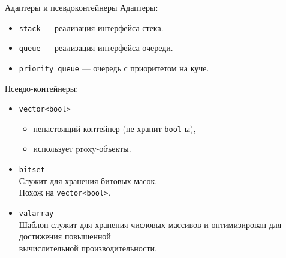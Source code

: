 \documentclass[aspectration=1610,t]{beamer}
\begin{document}
\begin{frame}{Адаптеры и псевдоконтейнеры}
    Адаптеры:
    \begin{itemize}
        \item {\tt stack} —
            реализация интерфейса стека.

        \item {\tt queue} —
            реализация интерфейса очереди.

        \item {\tt priority\_queue} —
            очередь с приоритетом на куче.
    \end{itemize}
    
    Псевдо-контейнеры:
    \begin{itemize}
        \item {\tt vector<bool>}
        \begin{itemize}
            \item ненастоящий контейнер (не хранит {\tt bool}-ы),
            \item использует proxy-объекты.
        \end{itemize}
        \item {\tt bitset}\\
            Служит для хранения битовых масок.\\ Похож на
            {\tt vector<bool>}.
                        
        \item {\tt valarray}\\
            Шаблон служит для хранения числовых массивов
            и оптимизирован для достижения повышенной\\ вычислительной
            производительности. 
    \end{itemize}
\end{frame}
\end{document}
